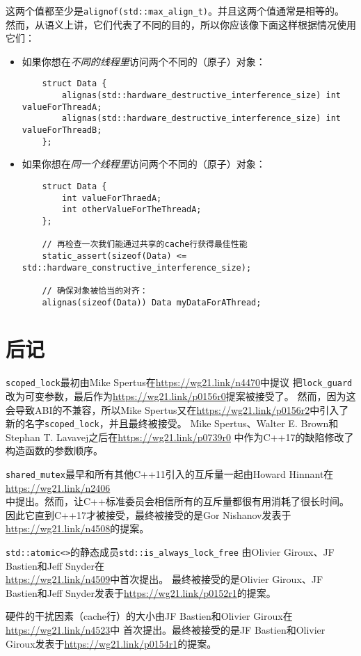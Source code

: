 这两个值都至少是\texttt{alignof(std::max\_align\_t)}。并且这两个值通常是相等的。
然而，从语义上讲，它们代表了不同的目的，所以你应该像下面这样根据情况使用它们：
\begin{itemize}
    \item 如果你想在\emph{不同的线程里}访问两个不同的（原子）对象：
    \begin{lstlisting}
    struct Data {
        alignas(std::hardware_destructive_interference_size) int valueForThreadA;
        alignas(std::hardware_destructive_interference_size) int valueForThreadB;
    };
    \end{lstlisting}
    \item 如果你想在\emph{同一个线程里}访问两个不同的（原子）对象：
    \begin{lstlisting}
    struct Data {
        int valueForThraedA;
        int otherValueForTheThreadA;
    };

    // 再检查一次我们能通过共享的cache行获得最佳性能
    static_assert(sizeof(Data) <= std::hardware_constructive_interference_size);

    // 确保对象被恰当的对齐：
    alignas(sizeof(Data)) Data myDataForAThread;
    \end{lstlisting}
\end{itemize}

\section{后记}
\texttt{scoped\_lock}最初由Mike Spertus在\url{https://wg21.link/n4470}中提议
把\texttt{lock\_guard}改为可变参数，最后作为\url{https://wg21.link/p0156r0}提案被接受了。
然而，因为这会导致ABI的不兼容，所以Mike Spertus又在\url{https://wg21.link/p0156r2}中引入了
新的名字\texttt{scoped\_lock}，并且最终被接受。
Mike Spertus、Walter E. Brown和Stephan T. Lavavej之后在\url{https://wg21.link/p0739r0}
中作为C++17的缺陷修改了构造函数的参数顺序。

\texttt{shared\_mutex}最早和所有其他C++11引入的互斥量一起由Howard Hinnant在
\url{https://wg21.link/n2406}\\
中提出。然而，让C++标准委员会相信所有的互斥量都很有用消耗了很长时间。
因此它直到C++17才被接受，最终被接受的是Gor Nishanov发表于\url{https://wg21.link/n4508}的提案。

\texttt{std::atomic<>}的静态成员\texttt{std::is\_always\_lock\_free}
由Olivier Giroux、JF Bastien和Jeff Snyder在\\
\url{https://wg21.link/n4509}中首次提出。
最终被接受的是Olivier Giroux、JF Bastien和Jeff Snyder发表于\url{https://wg21.link/p0152r1}的提案。

硬件的干扰因素（cache行）的大小由JF Bastien和Olivier Giroux在\url{https://wg21.link/n4523}中
首次提出。最终被接受的是JF Bastien和Olivier Giroux发表于\url{https://wg21.link/p0154r1}的提案。
